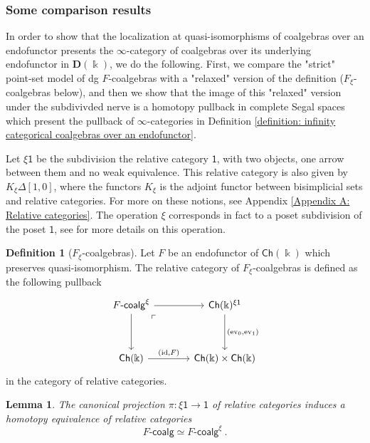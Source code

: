 \documentclass{proc-l}
\theoremstyle{plain}
\newtheorem{lemma}[{theorem}]{Lemma}
\theoremstyle{definition}
\newtheorem{definition}[{theorem}]{Definition}
\theoremstyle{remark}
\newcommand{\kk}{\Bbbk}
\begin{document}
\subsubsection{Some comparison results}%
\label{Section:4.1.3} In order to show that the localization at quasi-isomorphisms of coalgebras over an endofunctor presents the $\infty$-category of coalgebras over its underlying endofunctor in $\mathbf{D}(\kk)$, we do the following. First, we compare the "strict" point-set model of dg $F$-coalgebras with a "relaxed" version of the definition ($F_\xi$-coalgebras below), and then we show that the image of this "relaxed" version under the subdivivded nerve is a homotopy pullback in complete Segal spaces which present the pullback of $\infty$-categories in Definition \ref{definition: infinity categorical coalgebras over an endofunctor}.

\usetikzlibrary{arrows,decorations.pathmorphing,backgrounds,positioning,fit,petri,calc,intersections}

Let $\xi\mathsf{1}$ be the subdivision the relative category $\mathsf{1}$, with two objects, one arrow between them and no weak equivalence. This relative category is also given by $K_{\xi}\Delta[1,0]$, where the functors $K_{\xi}$ is the adjoint functor between bisimplicial sets and relative categories. For more on these notions, see Appendix \ref{Appendix A: Relative categories}. The operation $\xi$ corresponds in fact to a poset subdivision of the poset $\mathsf{1}$, see \cite[Section 4]{BarwickKan1} for more details on this operation.

\begin{definition}[{$F_\xi$-coalgebras}]%
\label{Definition:4.5}
Let $F$ be an endofunctor of $\mathsf{Ch}(\kk)$ which preserves quasi-isomorphism. The relative category of $F_\xi$-coalgebras is defined as the following pullback
\[
\begin{tikzcd}[column sep=3pc,row sep=3pc]
F\text{-}\mathsf{coalg}^{\xi} \arrow[r] \arrow[d] \arrow[dr, phantom, "\ulcorner", very near start]
& \mathsf{Ch}(\kk)^{\xi\mathsf{1}} \arrow[d,"{(\mathrm{ev}_0,\mathrm{ev}_1)}"]  \\
\mathsf{Ch}(\kk) \arrow[r,"{(\mathrm{id},F)}"]
& \mathsf{Ch}(\kk) \times  \mathsf{Ch}(\kk)
\end{tikzcd}
\]
in the category of relative categories.
\end{definition}

\begin{lemma}%
\label{Lemma:4.6}\label{lemma: xi-coalgebras}
The canonical projection $\pi: \xi\mathsf{1} \longrightarrow \mathsf{1}$ of relative categories induces a homotopy equivalence of relative categories
\[
F\text{-}\mathsf{coalg}\simeq F\text{-}\mathsf{coalg}^{\xi}~.
\]
\end{lemma}
\end{document}
